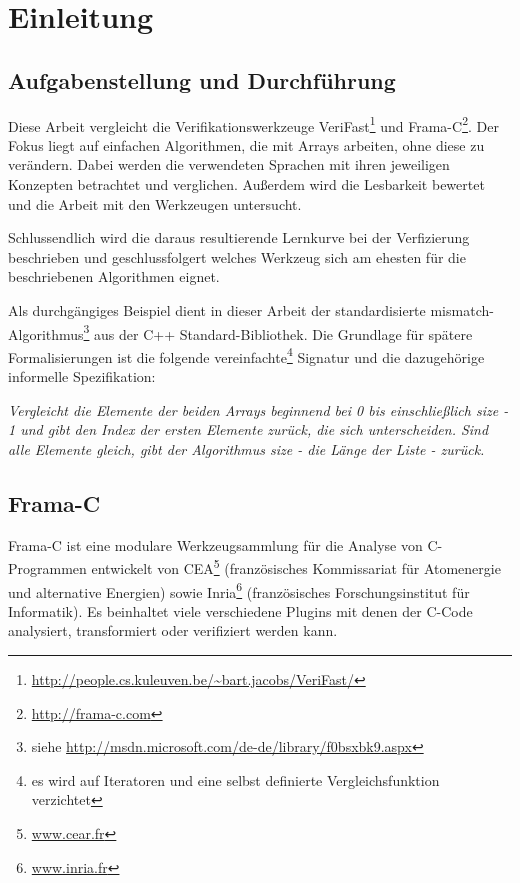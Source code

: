 ﻿\chapter{Einleitung}

\section{Aufgabenstellung und Durchführung}
\label{sec:aufgabenstellung}
Diese Arbeit vergleicht die Verifikationswerkzeuge VeriFast\footnote{
\url{http://people.cs.kuleuven.be/~bart.jacobs/VeriFast/}} und Frama-C\footnote{\url{http://frama-c.com}}.
Der Fokus liegt auf einfachen Algorithmen, die mit Arrays arbeiten, ohne diese zu verändern.
Dabei werden die verwendeten Sprachen mit ihren jeweiligen Konzepten betrachtet und verglichen. Außerdem
wird die Lesbarkeit bewertet und die Arbeit mit den Werkzeugen untersucht. 

Schlussendlich wird die daraus resultierende Lernkurve bei der Verfizierung beschrieben und geschlussfolgert
welches Werkzeug sich am ehesten für die beschriebenen Algorithmen eignet.

Als durchgängiges Beispiel dient in dieser Arbeit der standardisierte mismatch-Algorithmus\footnote{siehe
\url{http://msdn.microsoft.com/de-de/library/f0bsxbk9.aspx}} aus
der C++ Standard-Bibliothek. Die Grundlage für spätere Formalisierungen ist die folgende vereinfachte\footnote{es
wird auf Iteratoren und eine selbst definierte Vergleichsfunktion verzichtet} Signatur und 
die dazugehörige informelle Spezifikation:

\lstset{frame=none}    

\lstset{frame=single}

\noindent \emph{Vergleicht die Elemente der beiden Arrays beginnend bei 0 bis einschließlich size - 1 und gibt den
Index der ersten Elemente zurück, die sich unterscheiden. Sind alle Elemente gleich, gibt der Algorithmus
size - die Länge der Liste - zurück.}


\section{Frama-C}
\label{acsl-und-frama-c}

Frama-C ist eine modulare Werkzeugsammlung für die Analyse von C-Programmen entwickelt von CEA\footnote{\url{www.cear.fr}}
(französisches Kommissariat für Atomenergie und alternative Energien) sowie Inria\footnote{\url{www.inria.fr}} 
(französisches Forschungsinstitut für Informatik). Es beinhaltet viele verschiedene Plugins mit denen der C-Code
analysiert, transformiert oder verifiziert werden kann. 

